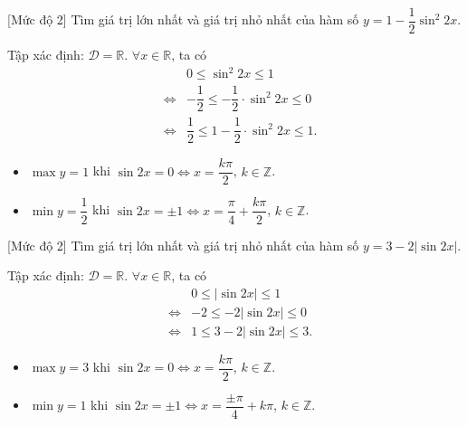 \begin{bt}%
	[Mức độ 2]
	Tìm giá trị lớn nhất và giá trị nhỏ nhất của hàm số $ y=1-\dfrac{1}{2} \sin^2 2 x $.
	\loigiai
	{
		Tập xác định: $ \mathscr{D}=\mathbb{R}$. $ \forall x \in \mathbb{R} $, ta có 
		\begin{eqnarray*}
			&& 0 \leq  \sin^2 2 x \leq 1\\
			&\Leftrightarrow& -\dfrac{1}{2} \leq  -\dfrac{1}{2}\cdot\sin^2 2 x \leq 0\\
			&\Leftrightarrow& \dfrac{1}{2} \leq  1-\dfrac{1}{2}\cdot\sin^2 2 x \leq 1.
		\end{eqnarray*}
	\begin{itemize}
		\item $ \max y=1 $ khi $ \sin  2 x=0 \Leftrightarrow x=\dfrac{k\pi}{2}$, $k\in \mathbb{Z}$.
		\item $ \min y=\dfrac{1}{2} $ khi $ \sin  2 x=\pm1 \Leftrightarrow x=\dfrac{\pi}{4}+\dfrac{k\pi}{2}$, $k\in \mathbb{Z}$.
	\end{itemize}
	}
\end{bt}

\begin{bt}%
	[Mức độ 2]
	Tìm giá trị lớn nhất và giá trị nhỏ nhất của hàm số $ y=3-2|\sin 2 x| $.
	\loigiai
	{
		Tập xác định: $ \mathscr{D}=\mathbb{R}$. $ \forall x \in \mathbb{R} $, ta có 
		\begin{eqnarray*}
			&&0\leq	|\sin 2 x|\leq 1\\
			&\Leftrightarrow&  -2\leq	-2|\sin 2 x|\leq 0\\
			&\Leftrightarrow&  1\leq	3-2|\sin 2 x|\leq 3.
		\end{eqnarray*}
	\begin{itemize}
		\item $ \max y=3 $ khi $ \sin 2 x=0 \Leftrightarrow x=\dfrac{k\pi}{2}$, $k\in \mathbb{Z}$.
		\item $ \min y=1$ khi $ \sin 2 x=\pm1 \Leftrightarrow x=\dfrac{\pm\pi}{4}+k\pi$, $k\in \mathbb{Z}$.
	\end{itemize}
	}
\end{bt}

